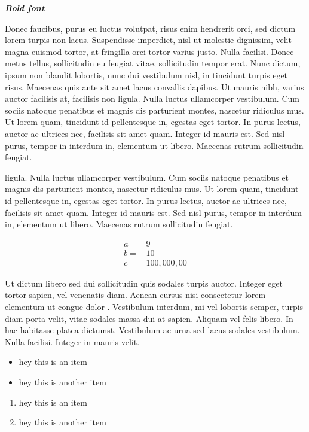 \textbf{\emph{Bold font}}

Donec faucibus, purus eu luctus volutpat, risus enim hendrerit orci, sed
dictum lorem turpis non lacus. Suspendisse imperdiet, nisl ut molestie
dignissim, velit magna euismod tortor, at fringilla orci tortor varius
justo. Nulla facilisi. Donec metus tellus, sollicitudin eu feugiat
vitae, sollicitudin tempor erat. Nunc dictum, ipsum non blandit
lobortis, nunc dui vestibulum nisl, in tincidunt turpis eget risus.
Maecenas quis ante sit amet lacus convallis dapibus. Ut mauris nibh,
varius auctor facilisis at, facilisis non ligula. Nulla luctus
ullamcorper vestibulum. Cum sociis natoque penatibus et magnis dis
parturient montes, nascetur ridiculus mus. Ut lorem quam, tincidunt id
pellentesque in, egestas eget tortor. In purus lectus, auctor ac
ultrices nec, facilisis sit amet quam. Integer id mauris est. Sed nisl
purus, tempor in interdum in, elementum ut libero. Maecenas rutrum
sollicitudin feugiat.

ligula. Nulla luctus ullamcorper vestibulum. Cum sociis natoque
penatibus et magnis dis parturient montes, nascetur ridiculus mus. Ut
lorem quam, tincidunt id pellentesque in, egestas eget tortor. In purus
lectus, auctor ac ultrices nec, facilisis sit amet quam. Integer id
mauris est. Sed nisl purus, tempor in interdum in, elementum ut libero.
Maecenas rutrum sollicitudin feugiat.

\begin{align*}
a =& 9 \\
b =& 10 \\
c =& 100,000,00
\end{align*}

Ut dictum libero sed dui sollicitudin quis sodales turpis auctor.
Integer eget tortor sapien, vel venenatis diam. Aenean cursus nisi
consectetur lorem elementum ut congue dolor . Vestibulum interdum, mi
vel lobortis semper, turpis diam porta velit, vitae sodales massa dui at
sapien. Aliquam vel felis libero. In hac habitasse platea dictumst.
Vestibulum ac urna sed lacus sodales vestibulum. Nulla facilisi. Integer
in mauris velit.

\begin{itemize}
\itemsep1pt\parskip0pt
\item
  hey this is an item
\item
  hey this is another item
\end{itemize}

\begin{enumerate}
\itemsep1pt\parskip0pt
\item
  hey this is an item
\item
  hey this is another item
\end{enumerate}

